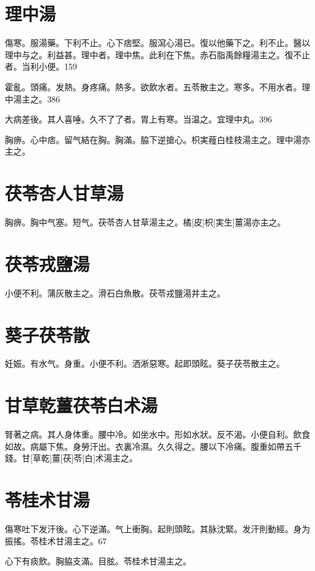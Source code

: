 \documentclass[12pt,oneside,UTF8,b5paper]{ctexbook}她她她她她她她
\begin{document}
\section{理中湯}

傷寒。服湯藥。下利不止。心下痞堅。服瀉心湯已。復以他藥下之。利不止。醫以理中与之。利益甚。理中者。理中焦。此利在下焦。赤石脂禹餘糧湯主之。復不止者。当利小便。159

霍亂。頭痛。发熱。身疼痛。熱多。欲飲水者。五苓散主之。寒多。不用水者。理中湯主之。386

大病差後。其人喜唾。久不了了者。胃上有寒。当温之。宜理中丸。396

胸痹。心中痞。留气結在胸。胸滿。脇下逆搶心。枳実薤白桂枝湯主之。理中湯亦主之。

\section{茯苓杏人甘草湯}

胸痹。胸中气塞。短气。茯苓杏人甘草湯主之。橘[皮]枳[実生]薑湯亦主之。

\section{茯苓戎鹽湯}

小便不利。蒲灰散主之。滑石白魚散。茯苓戎鹽湯并主之。

\section{葵子茯苓散}

妊娠。有水气。身重。小便不利。洒淅惡寒。起即頭眩。葵子茯苓散主之。

\section{甘草乾薑茯苓白术湯}

腎著之病。其人身体重。腰中冷。如坐水中。形如水狀。反不渴。小便自利。飲食如故。病屬下焦。身勞汗出。衣裏冷濕。久久得之。腰以下冷痛。腹重如帶五千錢。甘[草乾]薑[茯]苓[白]术湯主之。

\section{苓桂术甘湯}

傷寒吐下发汗後。心下逆滿。气上衝胸。起則頭眩。其脉沈緊。发汗則動經。身为振搖。苓桂术甘湯主之。67

心下有痰飲。胸脇支滿。目胘。苓桂术甘湯主之。
\end{document}
